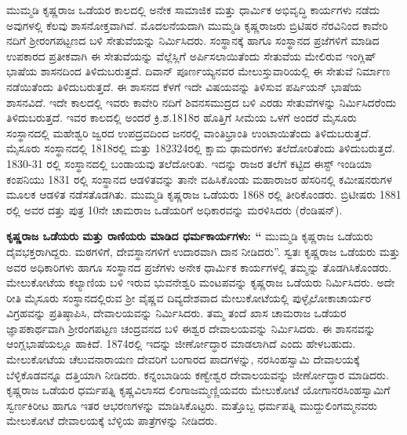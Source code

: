 \newpage

ಮುಮ್ಮಡಿ ಕೃಷ್ಣರಾಜ ಒಡೆಯರ ಕಾಲದಲ್ಲಿ ಅನೇಕ ಸಾಮಾಜಿಕ ಮತ್ತು ಧಾರ್ಮಿಕ ಅಭಿವೃದ್ಧಿ ಕಾರ್ಯಗಳು ನಡೆದು ಅವುಗಳಲ್ಲಿ ಕೆಲವು ಶಾಸನೋಕ್ತವಾಗಿವೆ. ಮೊದಲನೆಯದಾಗಿ ಮುಮ್ಮಡಿ ಕೃಷ್ಣರಾಜರು ಬ್ರಿಟಿಷರ ನೆರವಿನಿಂದ ಕಾವೇರಿ ನದಿಗೆ ಶ‍್ರೀರಂಗಪಟ್ಟಣದ ಬಳಿ ಸೇತುವೆಯನ್ನು ನಿರ್ಮಿಸಿದರು. ಸಂಸ್ಥಾನಕ್ಕೆ ಹಾಗೂ ಸಂಸ್ಥಾನದ ಪ್ರಜೆಗಳಿಗೆ ಮಾಡಿದ ಉಪಕಾರದ ಪ್ರತೀಕವಾಗಿ ಈ ಸೇತುವೆಯನ್ನು ವೆಲ್ಲೆಸ್ಲಿಗೆ ಅರ್ಪಿಸಲಾಯಿತೆಂದು ಸೇತುವೆಯ ಮೇಲಿರುವ ಇಂಗ್ಲಿಷ್​ ಭಾಷೆಯ ಶಾಸನದಿಂದ ತಿಳಿದುಬರುತ್ತದೆ. ದಿವಾನ್​ ಪೂರ್ಣಯ್ಯನವರ ಮೇಲುಸ್ತುವಾರಿಯಲ್ಲಿ ಈ ಸೇತುವೆ ನಿರ್ಮಾಣ ನಡೆಯಿತೆಂದು ತಿಳಿದು\-ಬರುತ್ತದೆ. ಈ ಶಾಸನದ ಕೆಳಗೆ ಇದೇ ವಿಷಯವನ್ನು ತಿಳಿಸುವ ಪರ್ಷಿಯನ್​ ಭಾಷೆಯ ಶಾಸನವಿದೆ. ಇದೇ ಕಾಲದಲ್ಲಿ ಇವರು ಕಾವೇರಿ ನದಿಗೆ ಶಿವನಸಮುದ್ರದ ಬಳಿ ಎರಡು ಸೇತುವೆಗಳನ್ನು ನಿರ್ಮಿಸಿದರೆಂದು ತಿಳಿದುಬರುತ್ತದೆ. ಇವರ ಕಾಲದಲ್ಲಿ ಅಂದರೆ ಕ್ರಿ.ಶ.1818ರ ಹೊತ್ತಿಗೆ ಸೀಮೆಯ ಒಳಗೆ ಅಂದರೆ ಮೈಸೂರು ಸಂಸ್ಥಾನದಲ್ಲಿ ಮಹೇಶ್ವರಿ ಜ್ವರದ ಉಪದ್ರವದಿಂದ ಜನರಲ್ಲಿ ವಾಂತಿಭ್ರಾಂತಿ ಉಂಟಾಯಿತೆಂದು ತಿಳಿದುಬರುತ್ತದೆ. ಮೈಸೂರು ಸಂಸ್ಥಾನದಲ್ಲಿ 1818ರಲ್ಲಿ ಮತ್ತು 1823\enginline{-}24ರಲ್ಲಿ ಕ್ಷಾಮ ಢಾಮರಗಳು ತಲೆದೋರಿತೆಂದು ತಿಳಿದುಬರುತ್ತದೆ. 1830-31 ರಲ್ಲಿ ಸಂಸ್ಥಾನದಲ್ಲಿ ಬಂಡಾಯವು ತಲೆದೋರಿತು. ಇದನ್ನು ರಾಜರ ತಲೆಗೆ ಕಟ್ಟಿದ ಈಸ್ಟ್ ಇಂಡಿಯಾ ಕಂಪನಿಯು 1831 ರಲ್ಲಿ ಸಂಸ್ಥಾನದ ಆಡಳಿತವನ್ನು ತಾನೇ ವಹಿಸಿಕೊಂಡು ಮಹಾರಾಜರ ಹೆಸರಿನಲ್ಲಿ ಕಮೀಷನರುಗಳ ಮೂಲಕ ಆಡಳಿತ ನಡೆಸತೊಡಗಿತು. ಮುಮ್ಮಡಿ ಕೃಷ್ಣರಾಜ ಒಡೆಯರು 1868 ರಲ್ಲಿ ತೀರಿ\-ಕೊಂಡರು. ಬ್ರಿಟೀಷರು 1881 ರಲ್ಲಿ ಅವರ ದತ್ತು ಪುತ್ರ 10ನೇ ಚಾಮರಾಜ ಒಡೆಯರಿಗೆ ಅಧಿಕಾರವನ್ನು ಮರಳಿಸಿದರು (ರೆಂಡಿಷನ್).

\textbf{ ಕೃಷ್ಣರಾಜ ಒಡೆಯರು ಮತ್ತು ರಾಣಿಯರು ಮಾಡಿದ ಧರ್ಮಕಾರ್ಯಗಳು: “} ಮುಮ್ಮಡಿ ಕೃಷ್ಣರಾಜ ಒಡೆಯರು ದೈವಭಕ್ತರಾಗಿದ್ದರು. ಮಠಗಳಿಗೆ, ದೇವಸ್ಥಾನಗಳಿಗೆ ಉದಾರವಾಗಿ ದಾನ ನೀಡಿದರು”. ಸ್ವತಃ ಕೃಷ್ಣರಾಜ ಒಡೆಯರು ಮತ್ತು ಅವರ ಅಧಿಕಾರಿಗಳು ಹಾಗೂ ಸಂಸ್ಥಾನದ ಪ್ರಜೆಗಳು ಅನೇಕ ಧಾರ್ಮಿಕ ಕಾರ್ಯಗಳಲ್ಲಿ ತಮ್ಮನ್ನು ತೊಡಗಿಸಿಕೊಂಡರು. ಮೇಲುಕೋಟೆಯ ಕಲ್ಯಾಣಿಯ ಬಳಿ ಇರುವ ಭುವನೇಶ್ವರಿ ಮಂಟಪವನ್ನು ಕೃಷ್ಣರಾಜ ಒಡೆಯರು ನಿರ್ಮಿಸಿದರು. ಅದೇ ರೀತಿ ಮೈಸೂರು ಸಂಸ್ಥಾನದಲ್ಲಿರುವ ಶ‍್ರೀ ವೈಷ್ಣವ ದಿವ್ಯದೇಶವಾದ ಮೇಲುಕೋಟೆಯಲ್ಲಿ ಪುಳ್ಳೈಲೋಕಾಚಾರ್ಯರ ವಿಗ್ರಹವನ್ನು ಪ್ರತಿಷ್ಠಾಪಿಸಿ, ದೇವಾಲಯವನ್ನು ನಿರ್ಮಿಸಿದರು. ತಮ್ಮ ತಂದೆ ಖಾಸ ಚಾಮರಾಜ ಒಡೆಯರ ಜ್ಞಾಪಕಾರ್ಥ\-ವಾಗಿ ಶ‍್ರೀರಂಗಪಟ್ಟಣ ಚಂದ್ರವನದ ಬಳಿ ಈಶ್ವರ ದೇವಾಲಯವನ್ನು ನಿರ್ಮಿಸಿದರು. ಈ ಶಾಸನವನ್ನು ಆಂಗ್ಲಭಾಷೆ\-ಯಲ್ಲೂ ಹಾಕಿದೆ. 1874ರಲ್ಲಿ ಇದನ್ನು ಜೀರ್ಣೋದ್ಧಾರ ಮಾಡಲಾಗಿದೆ ಎಂದು ಹೇಳಬಹುದು. ಮೇಲುಕೋಟೆಯ ಚೆಲುವನಾರಾಯಣ ದೇವರಿಗೆ ಬಂಗಾರದ ಪಾದಗಳನ್ನು, ನರಸಿಂಹಸ್ವಾಮಿ ದೇವಾಲಯಕ್ಕೆ ಬೆಳ್ಳಿಕೊಡವನ್ನೂ ದತ್ತಿಯಾಗಿ ನೀಡಿದರು. ಕನ್ನಂಬಾಡಿಯ ಕಣ್ವೇಶ್ವರ ದೇವಾಲಯವನ್ನು ಜೀರ್ಣೋದ್ಧಾರ ಮಾಡಿದರು. ಕೃಷ್ಣರಾಜ ಒಡೆಯರ ಧರ್ಮಪತ್ನಿ ಕೃಷ್ಣವಿಲಾಸದ ಲಿಂಗಾಜಮ್ಮಣ್ಣಿಯವರು ಮೇಲುಕೋಟೆ ಯೋಗಾನರಸಿಂಹಸ್ವಾಮಿಗೆ ಸ್ವರ್ಣಕಿರೀಟ ಹಾಗೂ ಇತರ ಆಭರಣಗಳನ್ನು ಮಾಡಿಸಿಕೊಟ್ಟರು. ಮತ್ತೊಬ್ಬ ಧರ್ಮಪತ್ನಿ ಮುದ್ದುಲಿಂಗಮ್ಮನವರು ಮೇಲುಕೋಟೆ ದೇವಾಲಯಕ್ಕೆ ಬೆಳ್ಳಿಯ ಪಾತ್ರೆಗಳನ್ನು ನೀಡಿದರು.

